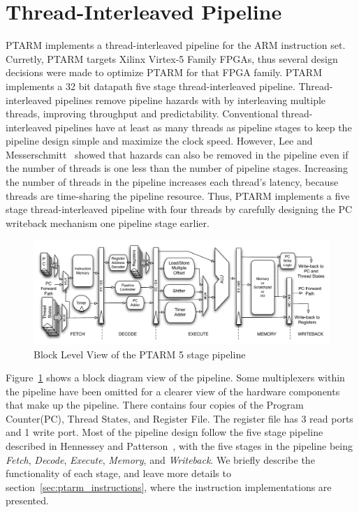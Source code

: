 \section{Thread-Interleaved Pipeline}
PTARM implements a thread-interleaved pipeline for the ARM instruction set.
Curretly, PTARM targets Xilinx Virtex-5 Family FPGAs, thus several design decisions were made to optimize PTARM for that FPGA family.
PTARM implements a 32 bit datapath five stage thread-interleaved pipeline.
Thread-interleaved pipelines remove pipeline hazards with by interleaving multiple threads, improving throughput and predictability. 
Conventional thread-interleaved pipelines have at least as many threads as pipeline stages to keep the pipeline design simple and maximize the clock speed.
However, Lee and Messerschmitt~\cite{lee1987pip} showed that hazards can also be removed in the pipeline even if the number of threads is one less than the number of pipeline stages.  
Increasing the number of threads in the pipeline increases each thread's latency, because threads are time-sharing the pipeline resource. 
Thus, PTARM implements a five stage thread-interleaved pipeline with four threads by carefully designing the PC writeback mechanism one pipeline stage earlier.

\begin{figure}[b]
  \vspace{-20pt}
  \begin{center}
    \includegraphics[scale=.54]{figs/ptarm_pipeline_five_stage}
  \end{center}
  \vspace{-20pt}
  \caption{Block Level View of the PTARM 5 stage pipeline}
  \label{fig:ptarm_pipeline_five_stage}
\end{figure}

Figure~\ref{fig:ptarm_pipeline_five_stage} shows a block diagram view of the pipeline. 
Some multiplexers within the pipeline have been omitted for a clearer view of the hardware components that make up the pipeline.
There contains four copies of the Program Counter(PC), Thread States, and Register File.
The register file has 3 read ports and 1 write port.
Most of the pipeline design follow the five stage pipeline described in Hennessey and Patterson~\cite{Hennessey2007CompArch}, with the five stages in the pipeline being \emph{Fetch}, \emph{Decode}, \emph{Execute}, \emph{Memory}, and \emph{Writeback}.
We briefly describe the functionality of each stage, and leave more details to section~\ref{sec:ptarm_instructions}, where the instruction implementations are presented.

